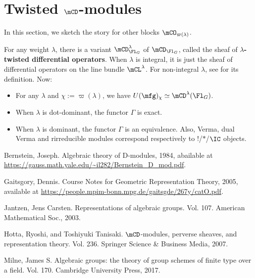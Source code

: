 \section{Twisted \texorpdfstring{$\mCD$}{D}-modules}

	In this section, we sketch the story for other blocks $\mCO_{\varpi(\lambda)}$.

	For any weight $\lambda$, there is a variant $\mCD_{\Fl_G}^\lambda$ of $\mCD_{\Fl_G}$, called the sheaf of \textbf{$\lambda$-twisted differential operators}. When $\lambda$ is integral, it is just the sheaf of differential operators on the line bundle $\mCL^\lambda$. For non-integral $\lambda$, see \cite[Section 9]{G} for its definition. Now:
	\begin{itemize}
		\item 
			For any $\lambda$ and $\chi:=\varpi(\lambda)$, we have $U(\mfg)_{\chi} \simeq \mCD^\lambda(\Fl_G)$.
		\item 
			When $\lambda$ is dot-dominant, the functor $\Gamma$ is exact.
		\item
			When $\lambda$ is dominant, the functor $\Gamma$ is an equivalence. Also, Verma, dual Verma and rirreducible modules correspond respectively to $!$/$*$/$\IC$ objects.
	\end{itemize} 
	

	

\begin{thebibliography}{Yau}

	 Bernstein, Joseph. Algebraic theory of D-modules, 1984, abailable at \url{https://gauss.math.yale.edu/~il282/Bernstein_D_mod.pdf}.
	

	 Gaitsgory, Dennis. Course Notes for Geometric Representation Theory, 2005, available at \url{https://people.mpim-bonn.mpg.de/gaitsgde/267y/catO.pdf}.

	 Jantzen, Jens Carsten. Representations of algebraic groups. Vol. 107. American Mathematical Soc., 2003.

	 Hotta, Ryoshi, and Toshiyuki Tanisaki. $\mCD$-modules, perverse sheaves, and representation theory. Vol. 236. Springer Science \& Business Media, 2007.

	 Milne, James S. Algebraic groups: the theory of group schemes of finite type over a field. Vol. 170. Cambridge University Press, 2017.
\end{thebibliography}


 


